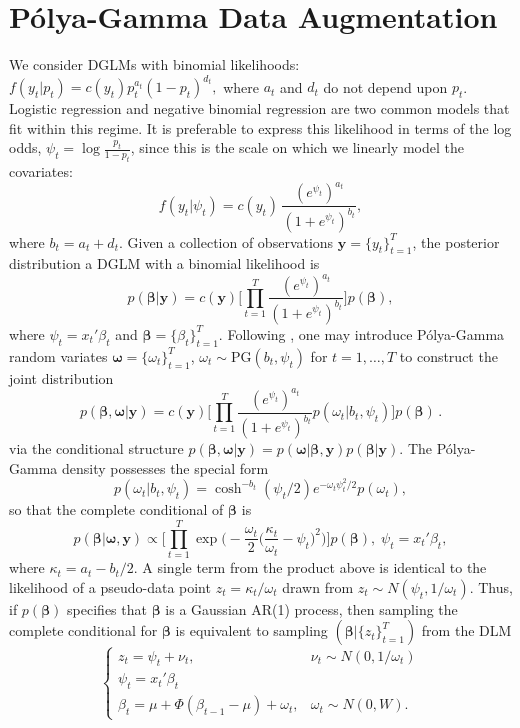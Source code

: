 \documentclass[12pt]{article}
\newcommand{\Polya}{P\'{o}lya}
\newcommand{\PG}{\text{PG}}
\newcommand{\bbeta}{\boldsymbol{\beta}}
\newcommand{\oomega}{\boldsymbol{\omega}}
\newcommand{\yy}{\boldsymbol{y}}
\begin{document}
\section{\Polya-Gamma Data Augmentation}

We consider DGLMs with binomial likelihoods: \( f(y_t | p_t) = c(y_t) p_t^{a_t}
(1-p_t)^{d_t}, \) where $a_t$ and $d_t$ do not depend upon $p_t$.  Logistic
regression and negative binomial regression are two common models that fit
within this regime.  It is preferable to express this likelihood in terms of the
log odds, $\psi_t = \log \frac{p_t}{1-p_t}$, since this is the scale on which we
linearly model the covariates:
\[
f(y_t | \psi_t) = c(y_t) \, \frac{(e^{\psi_t})^{a_t}}{(1+e^{\psi_t})^{b_t}},
\]
where $b_t = a_t + d_t$.  Given a collection of observations $\yy =
\{y_t\}_{t=1}^T$, the posterior distribution a DGLM with a binomial likelihood
is
\[
p(\bbeta | \yy) = c(\yy) \Big[ \prod_{t=1}^T
\frac{(e^{\psi_t})^{a_t}}{(1+e^{\psi_t})^{b_t}}
 \Big] p(\bbeta),
\]
where $\psi_t = x_t' \beta_t$ and $\bbeta = \{\beta_t\}_{t=1}^T$.  Following
\cite{polson-etal-2013}, one may introduce \Polya-Gamma random variates $\oomega
= \{\omega_t\}_{t=1}^T$, $\omega_t \sim \PG(b_t, \psi_t)$ for $t=1, \ldots, T$
to construct the joint distribution 
\[
p(\bbeta, \oomega | \yy) = c(\yy) \Big[ \prod_{t=1}^T
\frac{(e^{\psi_t})^{a_t}}{(1+e^{\psi_t})^{b_t}} p(\omega_t | b_t, \psi_t)
\Big] p(\bbeta) \, .
\]
via the conditional structure $p(\bbeta, \oomega | \yy) = p(\oomega | \bbeta,
\yy) p(\bbeta | \yy)$.  The \Polya-Gamma density possesses the special form
\[
p(\omega_t | b_t, \psi_t) = \cosh^{-b_t}(\psi_t/2) e^{- \omega_t \psi_t^2 / 2}
p(\omega_t),
\]
so that the complete conditional of $\bbeta$ is
\[
p(\bbeta | \oomega, \yy) \propto \Big[ \prod_{t=1}^T \exp \Big(-\frac{\omega_t}{2}
\Big(\frac{\kappa_t}{\omega_t} - \psi_t\Big)^2 \Big) \Big] p(\bbeta), \; \psi_t
= x_t' \beta_t,
\]
where $\kappa_t = a_t - b_t / 2$.  A single term from the product above is
identical to the likelihood of a pseudo-data point $z_t = \kappa_t / \omega_t$
drawn from $z_t \sim N(\psi_t, 1/\omega_t)$.  Thus, if $p(\bbeta)$ specifies
that $\bbeta$ is a Gaussian AR(1) process, then sampling the complete
conditional for $\bbeta$ is equivalent to sampling $(\bbeta | \{z_t\}_{t=1}^T)$
from the DLM
\[
\begin{cases}
z_t = \psi_t + \nu_t, & \nu_t \sim N(0, 1/\omega_t) \\
\psi_t = x_t' \beta_t \\
\beta_t = \mu + \Phi (\beta_{t-1} - \mu) + \omega_t, & \omega_t \sim N(0, W).
\end{cases}
\]
\end{document}
